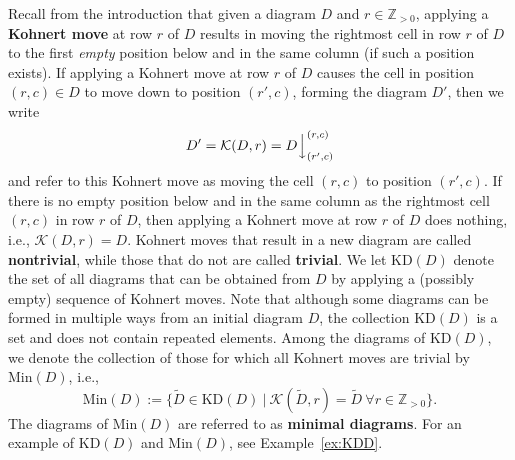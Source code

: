 \documentclass[letterpaper,10pt]{article}
\newcommand{\ldownarrow}{\Big\downarrow}
\begin{document}
Recall from the introduction that given a diagram $D$ and $r\in\mathbb{Z}_{>0}$, applying a \textbf{Kohnert move} at row $r$ of $D$ results in moving the rightmost cell in row $r$ of $D$ to the first \textit{empty} position below and in the same column (if such a position exists). If applying a Kohnert move at row $r$ of $D$ causes the cell in position $(r,c)\in D$ to move down to position $(r',c)$, forming the diagram $D'$, then we write 
$$D'=\mathcal{K}(D,r)=D\ldownarrow^{(r,c)}_{(r',c)}$$ 
and refer to this Kohnert move as moving the cell $(r,c)$ to position $(r',c)$. If there is no empty position below and in the same column as the rightmost cell $(r,c)$ in row $r$ of $D$, then applying a Kohnert move at row $r$ of $D$ does nothing, i.e., $\mathcal{K}(D,r)=D$. Kohnert moves that result in a new diagram are called \textbf{nontrivial}, while those that do not are called \textbf{trivial}. We let $\mathrm{KD}(D)$ denote the set of all diagrams that can be obtained from $D$ by applying a (possibly empty) sequence of Kohnert moves. Note that although some diagrams can be formed in multiple ways from an initial diagram $D$, the collection $\mathrm{KD}(D)$ is a set and does not contain repeated elements. Among the diagrams of $\mathrm{KD}(D)$, we denote the collection of those for which all Kohnert moves are trivial by $\textrm{Min}(D)$, i.e., $$\mathrm{Min}(D):=\{\tilde{D}\in \mathrm{KD}(D)~|~\mathcal{K}(\tilde{D},r)=\tilde{D}~\forall r\in\mathbb{Z}_{>0}\}.$$ The diagrams of $\mathrm{Min}(D)$ are referred to as \textbf{minimal diagrams}. For an example of $\mathrm{KD}(D)$ and $\mathrm{Min}(D)$, see Example~\ref{ex:KDD}.
\end{document}
